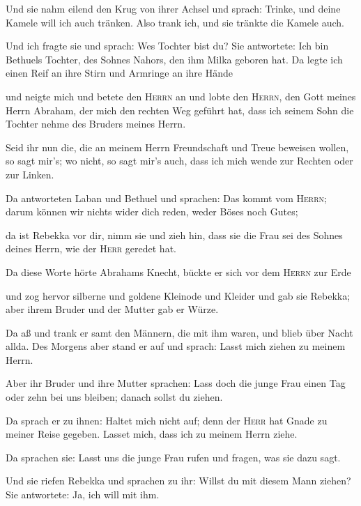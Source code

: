  Und sie nahm eilend den Krug von ihrer Achsel und
sprach: Trinke, und deine Kamele will ich auch tränken. Also trank ich,
und sie tränkte die Kamele auch.

 Und ich fragte sie und sprach: Wes Tochter bist du? Sie
antwortete: Ich bin Bethuels Tochter, des Sohnes Nahors, den ihm Milka
geboren hat. Da legte ich einen Reif an ihre Stirn und Armringe an ihre
Hände

 und neigte mich und betete den \textsc{Herrn} an und
lobte den \textsc{Herrn}, den Gott meines Herrn Abraham, der mich den
rechten Weg geführt hat, dass ich seinem Sohn die Tochter nehme des
Bruders meines Herrn.

 Seid ihr nun die, die an meinem Herrn Freundschaft und
Treue beweisen wollen, so sagt mir's; wo nicht, so sagt mir's auch, dass
ich mich wende zur Rechten oder zur Linken.

 Da antworteten Laban und Bethuel und sprachen: Das kommt
vom \textsc{Herrn}; darum können wir nichts wider dich reden, weder
Böses noch Gutes;

 da ist Rebekka vor dir, nimm sie und zieh hin, dass sie
die Frau sei des Sohnes deines Herrn, wie der \textsc{Herr} geredet hat.

 Da diese Worte hörte Abrahams Knecht, bückte er sich vor
dem \textsc{Herrn} zur Erde

 und zog hervor silberne und goldene Kleinode und Kleider
und gab sie Rebekka; aber ihrem Bruder und der Mutter gab er Würze.

 Da aß und trank er samt den Männern, die mit ihm waren,
und blieb über Nacht allda. Des Morgens aber stand er auf und sprach:
Lasst mich ziehen zu meinem Herrn.

 Aber ihr Bruder und ihre Mutter sprachen: Lass doch die
junge Frau einen Tag oder zehn bei uns bleiben; danach sollst du ziehen.

 Da sprach er zu ihnen: Haltet mich nicht auf; denn der
\textsc{Herr} hat Gnade zu meiner Reise gegeben. Lasset mich, dass ich
zu meinem Herrn ziehe.

 Da sprachen sie: Lasst uns die junge Frau rufen und
fragen, was sie dazu sagt.

 Und sie riefen Rebekka und sprachen zu ihr: Willst du
mit diesem Mann ziehen? Sie antwortete: Ja, ich will mit ihm.

